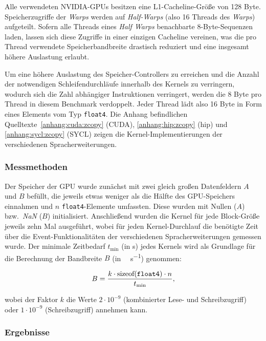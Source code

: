 Alle verwendeten NVIDIA-GPUs besitzen eine L1-Cacheline-Größe von \num{128}
Byte. Speicherzugriffe der \textit{Warps} werden auf \textit{Half-Warps} (also
\num{16} Threads des \textit{Warps}) aufgeteilt. Sofern alle Threads eines
\textit{Half Warps} benachbarte \num{8}-Byte-Sequenzen laden, lassen sich diese
Zugriffe in einer einzigen Cacheline vereinen, was die pro Thread verwendete
Speicherbandbreite drastisch reduziert und eine insgesamt höhere Auslastung
erlaubt.

Um eine höhere Auslastung des Speicher-Controllers zu erreichen und die Anzahl
der notwendigen Schleifendurchläufe innerhalb des Kernels zu verringern, wodurch
sich die Zahl abhängiger Instruktionen verringert, werden die \num{8} Byte pro
Thread in diesem Benchmark verdoppelt. Jeder Thread lädt also \num{16} Byte in
Form eines Elements vom Typ \texttt{float4}. Die Anhang befindlichen
Quelltexte~\ref{anhang:cuda:zcopy} (CUDA), \ref{anhang:hip:zcopy} (\gls{hip})
und \ref{anhang:sycl:zcopy} (SYCL) zeigen die Kernel-Implementierungen der
verschiedenen Spracherweiterungen.

\subsubsection{Messmethoden}

Der Speicher der GPU wurde zunächst mit zwei gleich großen Datenfeldern $A$ und
$B$ befüllt, die jeweils etwas weniger als die Hälfte des GPU-Speichers
einnahmen und $n$ \texttt{float4}-Elemente umfassten. Diese wurden mit Nullen
($A$) bzw.\ \textit{NaN} ($B$) initialisiert. Anschließend wurden die Kernel für
jede Block-Größe jeweils zehn Mal ausgeführt, wobei für jeden Kernel-Durchlauf
die benötigte Zeit über die Event-Funktionalitäten der verschiedenen
Spracherweiterungen gemessen wurde. Der minimale Zeitbedarf $t_{\text{min}}$
(in \si{\second}) jedes Kernels wird als Grundlage für die Berechnung der
Bandbreite $B$ (in \si{\gibi\byte\per\second}) genommen:

\[
    B = \frac{k \cdot \text{sizeof(\texttt{float4})} \cdot n}{t_\text{min}},
\]

wobei der Faktor $k$ die Werte $2 \cdot 10^{-9}$ (kombinierter Lese- und
Schreibzugriff) oder $1 \cdot 10^{-9}$ (Schreibzugriff) annehmen kann.

\subsubsection{Ergebnisse}

